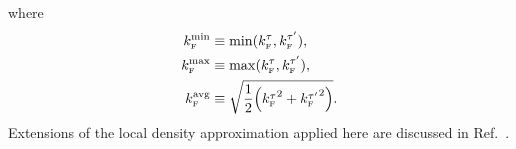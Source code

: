 \documentclass[10pt,aps,prc,floatfix,twocolumn,nofootinbib]{revtex4-1}
\begin{document}
%
where
%
\begin{align}
    \kFmin &\equiv \min(\kF^{\tau}, \kF^{\tau'}) ,\\
    \kFmax &\equiv \max(\kF^{\tau}, \kF^{\tau'}) ,\\
    \kFavg &\equiv \sqrt{\frac{1}{2}\Bigl({\kF^{\tau}}^2 +  {\kF^{\tau'}}^2\Bigr)} .
\end{align}
Extensions of the local density approximation applied here are discussed in Ref.~\cite{Tropiano:2021prep}.


\end{document}
